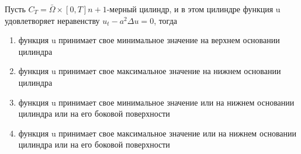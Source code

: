 Пусть \(C_T=\bar{\Omega }\times \left[0,T\right] n+1\)-мерный цилиндр, и в этом цилиндре функция u удовлетворяет неравенству \(u_t-a^2\Delta u=0\), тогда

\begin{enumerate}[label=\arabic*)]
    \item функция u принимает свое минимальное значение на верхнем основании цилиндра
    \item функция u принимает свое максимальное значение на нижнем основании цилиндра
    \item функция u принимает свое минимальное значение или на нижнем основании цилиндра или на его боковой поверхности
    \item функция u принимает свое максимальное значение или на нижнем основании цилиндра или на его боковой поверхности
\end{enumerate}

